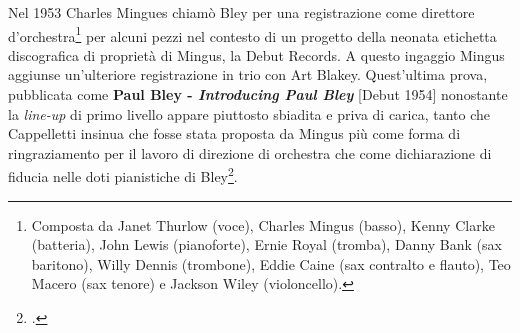 Nel 1953 Charles Mingues chiamò Bley per una registrazione come direttore d'orchestra\footnote{Composta da Janet Thurlow (voce), Charles Mingus (basso), Kenny Clarke (batteria), John Lewis (pianoforte), Ernie Royal (tromba), Danny Bank (sax baritono), Willy Dennis (trombone), Eddie Caine (sax contralto e flauto), Teo Macero (sax tenore) e Jackson Wiley (violoncello).} per alcuni pezzi nel contesto di un progetto della neonata etichetta discografica di proprietà di Mingus, la Debut Records. A questo ingaggio Mingus aggiunse un'ulteriore registrazione in trio con Art Blakey. Quest'ultima prova, pubblicata come \textbf{Paul Bley - \textit{Introducing Paul Bley}} [Debut 1954] nonostante la \textit{line-up} di primo livello appare piuttosto sbiadita e priva di carica, tanto che Cappelletti insinua che fosse stata proposta da Mingus più come forma di ringraziamento per il lavoro di direzione di orchestra che come dichiarazione di fiducia nelle doti pianistiche di Bley\footcite[49]{cappelletti}.\par
